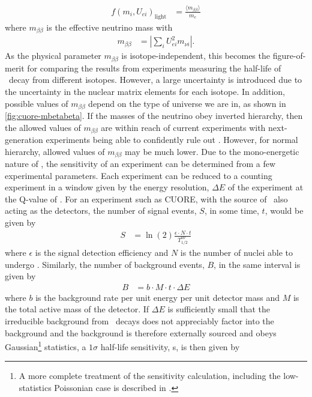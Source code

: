 \begin{align}
        f(m_i, U_{ei})_{\textrm{light}} &= \frac{\langle m_{\beta\beta}\rangle}{m_e}
\end{align}
where $m_{\beta\beta}$ is the effective neutrino mass with
\begin{align}
    m_{\beta\beta}&=|\sum_iU^2_{ei}m_{\nu i}|.
    \label{eq:mbetabeta}
\end{align}
As the physical parameter $m_{\beta\beta}$ is isotope-independent, this becomes the figure-of-merit for comparing the results from experiments measuring the half-life of \zeronubb~decay from different isotopes. However, a large uncertainty is introduced due to the uncertainty in the nuclear matrix elements for each isotope.
In addition, possible values of $m_{\beta\beta}$ depend on the type of universe we are in, as shown in \autoref{fig:cuore-mbetabeta}.
If the masses of the neutrino obey inverted hierarchy, then the allowed values of $m_{\beta\beta}$ are within reach of current experiments with next-generation experiments being able to confidently rule out \zeronubb. However, for normal hierarchy, allowed values of $m_{\beta\beta}$ may be much lower. 
Due to the mono-energetic nature of \zeronubb, the sensitivity of an experiment can be determined from a few experimental parameters.
Each experiment can be reduced to a counting experiment in a window given by the energy resolution, $\Delta E$ of the experiment at the Q-value of \zeronubb.
For an experiment such as CUORE, with the source of \zeronubb~also acting as the detectors, the number of signal events, $S$, in some time, $t$, would be given by
\begin{align}
    S &= \ln(2)\frac{\epsilon\cdot N \cdot t}{T^{0\nu}_{1/2}}
    \label{eq:signal_betabeta}
\end{align}
where $\epsilon$ is the signal detection efficiency and $N$ is the number of nuclei able to undergo \zeronubb.
Similarly, the number of background events, $B$, in the same interval is given by
\begin{align}
    B &= b\cdot M \cdot t \cdot \Delta E
    \label{eq:background_betabeta}
\end{align}
where $b$ is the background rate per unit energy per unit detector mass and $M$ is the total active mass of the detector.
If $\Delta E$ is sufficiently small that the irreducible background from \twonubb~decays does not appreciably factor into the background and the background is therefore externally sourced and obeys Gaussian\footnote{A more complete treatment of the sensitivity calculation, including the low-statistics Poissonian case is described in \cite{Alessandria:2011rc}.} statistics, a $1\sigma$ half-life sensitivity, s, is then given by
